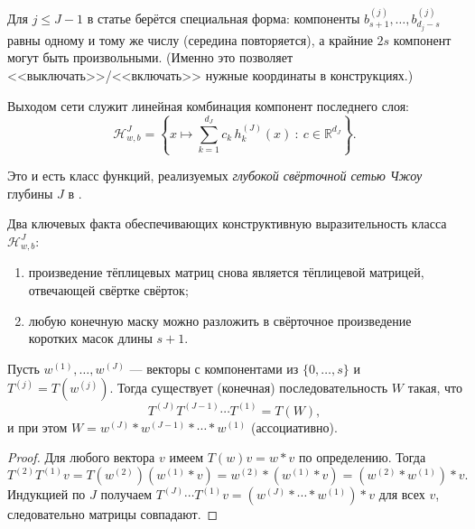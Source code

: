 \documentclass[../NDCNNAI_main.tex]{subfiles}
\begin{document}
\begin{definition}
Для $j\le J-1$ в статье берётся специальная форма:
компоненты $b^{(j)}_{s+1},\dots,b^{(j)}_{d_j-s}$ равны одному и тому же числу (середина повторяется),
а крайние $2s$ компонент могут быть произвольными.
(Именно это позволяет <<выключать>>/<<включать>> нужные координаты в конструкциях.)
\end{definition}

\begin{definition}
Выходом сети служит линейная комбинация компонент последнего слоя:
\[
\mathcal H^{J}_{w,b}
=
\left\{
x\mapsto \sum_{k=1}^{d_J} c_k\,h^{(J)}_k(x)\ :\ c\in\mathbb R^{d_J}
\right\}.
\]
\end{definition}
Это и есть класс функций, реализуемых \emph{глубокой свёрточной сетью Чжоу} глубины $J$ в \cite{Zhou2018}.

Два ключевых факта обеспечивающих конструктивную выразительность класса $\mathcal H^{J}_{w,b}$:
\begin{enumerate}
  \item произведение тёплицевых матриц снова является тёплицевой матрицей, отвечающей свёртке свёрток;
  \item любую конечную маску можно разложить в свёрточное произведение коротких масок длины $s+1$.
\end{enumerate}

\begin{lemma}
\label{lem:toeplitz_comp}
Пусть $w^{(1)},\dots,w^{(J)}$ --- векторы с компонентами из $\{0,\dots,s\}$ и $T^{(j)}=T(w^{(j)})$.
Тогда существует (конечная) последовательность $W$ такая, что
\[
T^{(J)}T^{(J-1)}\cdots T^{(1)}=T(W),
\]
и при этом $W=w^{(J)}*w^{(J-1)}*\cdots*w^{(1)}$ (ассоциативно).  
\end{lemma}
\begin{proof}
Для любого вектора $v$ имеем $T(w)v=w*v$ по определению.
Тогда
\[
T^{(2)}T^{(1)}v = T(w^{(2)})(w^{(1)}*v)=w^{(2)}*(w^{(1)}*v)=(w^{(2)}*w^{(1)})*v.
\]
Индукцией по $J$ получаем
\(
T^{(J)}\cdots T^{(1)}v=(w^{(J)}*\cdots*w^{(1)})*v
\)
для всех $v$, следовательно матрицы совпадают.  
\end{proof}
\end{document}
